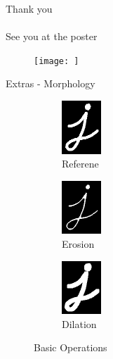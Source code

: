 \documentclass[10pt]{beamer}
\begin{document}
\begin{frame}

\begin{center}
    {\huge  Thank you \\ \\ See you at the poster}
    \begin{figure}
        \texttt{[image: ]}
    \end{figure}

\end{center}
\end{frame}

\begin{frame}{Extras - Morphology}

    \centering
    \begin{figure}
        
        \begin{subfigure}[b]{0.3\textwidth}
            \includegraphics[height = 2cm]{imgs/j.png}
            \caption{Referene}
        \end{subfigure}
        \begin{subfigure}[b]{0.3\textwidth}
            \includegraphics[height = 2cm]{imgs/erosion.png}
            \caption{Erosion}
        \end{subfigure}
        \begin{subfigure}[b]{0.3\textwidth}
            \includegraphics[height = 2cm]{imgs/dilation.png}
            \caption{Dilation}
        \end{subfigure}
    \caption{Basic Operations}
    \end{figure}


\end{frame}
\end{document}
